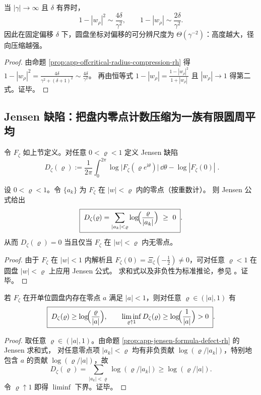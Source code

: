 \begin{corollary}[高高度压缩尺度]\label{cor:app-offcritical-radius-high-height-rh}
当 \(|\gamma|\to\infty\) 且 \(\delta\) 有界时，
$$
1-|w_{\rho}|^{2}\sim \frac{4\delta}{\gamma^{2}},
\qquad
1-|w_{\rho}|\sim \frac{2\delta}{\gamma^{2}}.
$$
因此在固定偏移 \(\delta\) 下，圆盘坐标对偏移的可分辨尺度为 \(\Theta(\gamma^{-2})\)：高度越大，径向压缩越强。
\end{corollary}
\begin{proof}
由命题 \ref{prop:app-offcritical-radius-compression-rh} 得
\(
1-|w_{\rho}|^{2}=\frac{4\delta}{\gamma^{2}+(\delta+1)^{2}}\sim\frac{4\delta}{\gamma^{2}}
\)。
再由恒等式 \(1-|w_{\rho}|=\frac{1-|w_{\rho}|^{2}}{1+|w_{\rho}|}\) 且 \(|w_{\rho}|\to 1\) 得第二式。证毕。
\end{proof}

\subsection{Jensen 缺陷：把盘内零点计数压缩为一族有限圆周平均}
\begin{definition}[Jensen 缺陷]\label{def:app-jensen-defect-rh}
令 \(F_\zeta\) 如上节定义。对任意 \(0<\varrho<1\) 定义 Jensen 缺陷
$$
\boxed{\;
D_\zeta(\varrho)
:=\frac{1}{2\pi}\int_{0}^{2\pi}\log\bigl|F_\zeta(\varrho e^{\mathrm{i}\theta})\bigr|\,\dd\theta
-\log|F_\zeta(0)|\; }.
$$
\end{definition}

\begin{proposition}\label{prop:app-jensen-formula-defect-rh}
设 \(0<\varrho<1\)。令 \(\{a_k\}\) 为 \(F_\zeta\) 在 \(|w|<\varrho\) 内的零点（按重数计）。
则 Jensen 公式给出
$$
\boxed{\;
D_\zeta(\varrho)
=\sum_{|a_k|<\varrho}\log\!\Bigl(\frac{\varrho}{|a_k|}\Bigr)\ \ge\ 0\; }.
$$
从而 \(D_\zeta(\varrho)=0\) 当且仅当 \(F_\zeta\) 在 \(|w|<\varrho\) 内无零点。
\end{proposition}
\begin{proof}
由于 \(F_\zeta\) 在 \(|w|<1\) 内解析且 \(F_\zeta(0)=\Xi_\zeta(-\tfrac12)\neq 0\)，可对任意 \(\varrho<1\) 在圆盘 \(|w|<\varrho\) 上应用 Jensen 公式。
求和式以及非负性为标准推论，参见 \cite{Duren1970TheoryHp}。证毕。
\end{proof}

\begin{proposition}\label{prop:app-jensen-single-zero-lower-bound-rh}
若 \(F_\zeta\) 在开单位圆盘内存在零点 \(a\) 满足 \(|a|<1\)，则对任意 \(\varrho\in(|a|,1)\) 有
$$
\boxed{\;
D_\zeta(\varrho)\ge \log\!\Bigl(\frac{\varrho}{|a|}\Bigr),
\qquad
\liminf_{\varrho\uparrow 1}D_\zeta(\varrho)\ge \log\!\Bigl(\frac{1}{|a|}\Bigr)>0\; }.
$$
\end{proposition}
\begin{proof}
取任意 \(\varrho\in(|a|,1)\)。由命题 \ref{prop:app-jensen-formula-defect-rh} 的 Jensen 求和式，
对任意零点项 \(|a_k|<\varrho\) 均有非负贡献 \(\log(\varrho/|a_k|)\)，特别地包含 \(a\) 的贡献 \(\log(\varrho/|a|)\)，故
$$
D_\zeta(\varrho)=\sum_{|a_k|<\varrho}\log(\varrho/|a_k|)\ge \log(\varrho/|a|).
$$
令 \(\varrho\uparrow 1\) 即得 \(\liminf\) 下界。证毕。
\end{proof}

